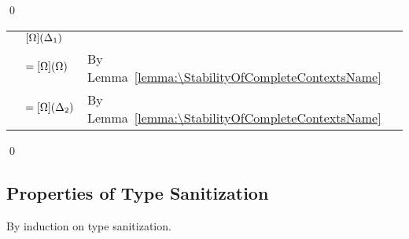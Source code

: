 \qed

\begin{lemma}[\ConfluenceOfCompletenessName]
  \label{lemma:\ConfluenceOfCompletenessName}
  \ConfluenceOfCompletenessBody
\end{lemma}

\proof

\mbox{} %

\begin{longtable}[l]{lll}
  & $[\Omega](\Delta_1) $
  & \\
  & $= [\Omega](\Omega) $
  & By Lemma~\ref{lemma:\StabilityOfCompleteContextsName} \\
  & $= [\Omega](\Delta_2) $
  & By Lemma~\ref{lemma:\StabilityOfCompleteContextsName} \\
\end{longtable}

\qed

\subsection{Properties of Type Sanitization}

\begin{lemma}[\TypeSanitizationExtensionName]
  \label{lemma:\TypeSanitizationExtensionName}
  \TypeSanitizationExtensionBody
\end{lemma}

\proof

By induction on type sanitization.

